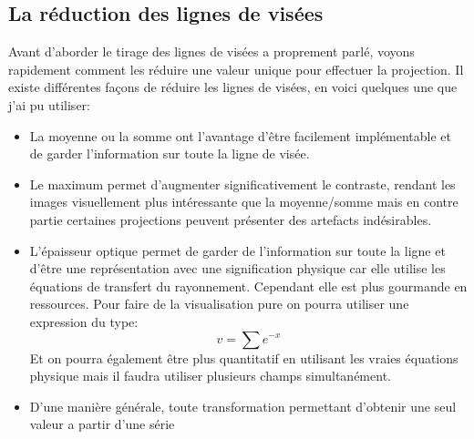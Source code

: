 \subsection{La réduction des lignes de visées}

Avant d'aborder le tirage des lignes de visées a proprement parlé, voyons rapidement comment les réduire une valeur unique pour effectuer la projection.
Il existe différentes façons de réduire les lignes de visées, en voici quelques une que j'ai pu utiliser:

\begin{itemize}
\item La moyenne ou la somme ont l'avantage d'être facilement implémentable et de garder l'information sur toute la ligne de visée.

\item Le maximum permet d'augmenter significativement le contraste, rendant les images visuellement plus intéressante que la moyenne/somme mais en contre partie certaines projections peuvent présenter des artefacts indésirables.

\item L'épaisseur optique permet de garder de l'information sur toute la ligne et d'être une représentation avec une signification physique car elle utilise les équations de transfert du rayonnement.
Cependant elle est plus gourmande en ressources.
Pour faire de la visualisation pure on pourra utiliser une expression du type:
\begin{equation}
v= \sum e^{-x}
\label{eq:epop}
\end{equation}
Et on pourra également être plus quantitatif en utilisant les vraies équations physique mais il faudra utiliser plusieurs champs simultanément. %

\item D'une manière générale, toute transformation permettant d'obtenir une seul valeur a partir d'une série

\end{itemize}



